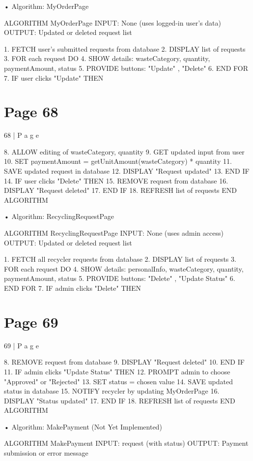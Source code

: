 \documentclass{article}
\begin{document}
• Algorithm: MyOrderPage 
 
ALGORITHM MyOrderPage 
INPUT: None (uses logged-in user’s data) 
OUTPUT: Updated or deleted request list 
  
1. FETCH user’s submitted requests from database 
2. DISPLAY list of requests 
3. FOR each request DO 
    4. SHOW details: wasteCategory, quantity, paymentAmount, status 
    5. PROVIDE buttons: "Update" , "Delete" 
6. END FOR 
7. IF user clicks "Update" THEN 

\section*{Page 68}
68 | P a g e 
 
    8. ALLOW editing of wasteCategory, quantity 
    9. GET updated input from user 
    10. SET paymentAmount = getUnitAmount(wasteCategory) * quantity 
    11. SAVE updated request in database 
    12. DISPLAY "Request updated" 
13. END IF 
14. IF user clicks "Delete" THEN 
    15. REMOVE request from database 
    16. DISPLAY "Request deleted" 
17. END IF 
18. REFRESH list of requests 
END ALGORITHM 
 
• Algorithm: RecyclingRequestPage 
 
ALGORITHM RecyclingRequestPage 
INPUT: None (uses admin access) 
OUTPUT: Updated or deleted request list 
  
1. FETCH all recycler requests from database 
2. DISPLAY list of requests 
3. FOR each request DO 
    4. SHOW details: personalInfo, wasteCategory, quantity, paymentAmount, status 
    5. PROVIDE buttons: "Delete" , "Update Status" 
6. END FOR 
7. IF admin clicks "Delete" THEN 

\section*{Page 69}
69 | P a g e 
 
    8. REMOVE request from database 
    9. DISPLAY "Request deleted" 
10. END IF 
11. IF admin clicks "Update Status" THEN 
    12. PROMPT admin to choose "Approved" or "Rejected" 
    13. SET status = chosen value 
    14. SAVE updated status in database 
    15. NOTIFY recycler by updating MyOrderPage 
    16. DISPLAY "Status updated" 
17. END IF 
18. REFRESH list of requests 
END ALGORITHM 
 
• Algorithm: MakePayment (Not Yet Implemented) 
 
ALGORITHM MakePayment 
INPUT: request (with status) 
OUTPUT: Payment submission or error message 
  
\end{document}
